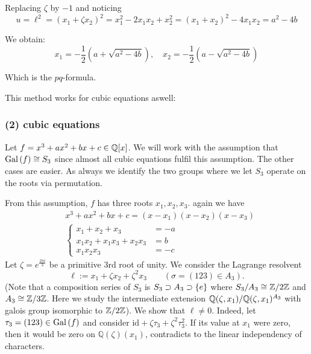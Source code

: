 \documentclass[twoside = false,	%
		headsepline,		%
		parskip = true,
		]{scrbook}						%
\begin{document}
            Replacing $\zeta$ by $-1$ and noticing
            \begin{equation*}
                u = \ell^2 = (x_1 + \zeta x_2)^2 = x_1^2 - 2x_1 x_2 + x_2^2 = (x_1 + x_2)^2 - 4x_1x_2 = a^2 -4b
            \end{equation*}
            
            We obtain:
            \begin{equation*}
                x_1 = -\frac{1}{2}\left(a + \sqrt{a^2 - 4b}\right), \quad x_2 = -\frac{1}{2}\left(a - \sqrt{a^2-4b}\right)
            \end{equation*}
        
            Which is the $pq$-formula.
            
            This method works for cubic equations aswell:
        
        \subsubsection{(2) cubic equations}
            Let $f=x^3+ax^2+bx+c \in\mathbb Q[x]$. We will work with the assumption that $\mathrm{Gal}\left( f\right)\cong S_3$ since almost all cubic equations fulfil this assumption. The other cases are easier. As always we identify the two groups where we let $S_3$ operate on the roots via permutation.
            
            From this assumption, $f$ has three roots $x_1,x_2,x_3$. again we have 
            \begin{align*}
                &x^3+ax^2+bx+c=(x-x_1)(x-x_2)(x-x_3)\\
                &\begin{cases}
                    x_1+x_2+x_3 &=-a\\
                    x_1x_2+x_1x_3+x_2x_3 &=b\\
                    x_1x_2x_3 &=-c
                \end{cases}
            \end{align*}
            Let $\zeta = e^{\frac{2\pi i}3}$ be a primitive 3rd root of unity. We consider the Lagrange resolvent
            $$\ell:=x_1+\zeta x_2+ \zeta^2 x_3 \qquad (\sigma = (123) \in A_3).$$
            (Note that a composition series of $S_3$ is $S_3\supset A_3 \supset \left\{ e\right\}$ where $S_3/A_3 \cong \mathbb Z/2\mathbb Z$ and $A_3\cong \mathbb Z/3\mathbb Z$. Here we study the intermediate extension $\mathbb Q(\zeta,x_1)/\mathbb Q(\zeta,x_1)^{A_3}$ with galois group isomorphic to $\mathbb Z/2\mathbb Z$).
            {\color{blue}We show that $\ell\neq 0$. Indeed, let $\tau_3=(123)\in\mathrm{Gal}\left( f\right)$ and consider $\mathrm{id}+\zeta\tau_3+\zeta^2\tau_3^2$. If its value at $x_1$ were zero, then it would be zero on $\mathbb{Q}(\zeta)(x_1)$, contradicts to the linear independency of characters.}
            
\end{document}
